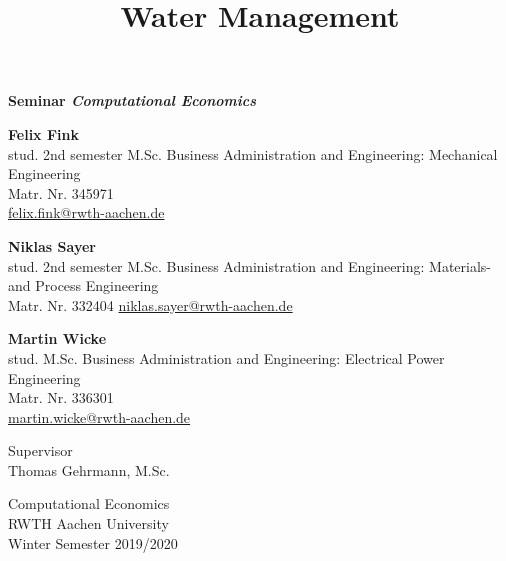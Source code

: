 \documentclass[12pt, a4paper, oneside]{article}
\title{Water Management}
\begin{document}
	
	
	\begin{titlepage}
		\begin{center}
			\vspace*{1cm}
			
			\textbf{Seminar \textit{Computational Economics}}                
			
			\vspace{0.5cm}
			{\makeatletter{\@title}\makeatother}
			
			\vspace{1.5cm}
			
			\textbf{Felix Fink} \\
			stud. 2nd semester M.Sc. Business Administration and Engineering: Mechanical Engineering \\
			Matr. Nr. 345971 \\
			\href{mailto:felix.fink@rwth-aachen.de}{felix.fink@rwth-aachen.de} 
			
			\vspace{1cm}
			
			\textbf{Niklas Sayer} \\
			stud. 2nd semester M.Sc. Business Administration and Engineering: Materials- and Process Engineering\\
			Matr. Nr. 332404
			\href{mailto:niklas.sayer@rwth-aachen.de}{niklas.sayer@rwth-aachen.de} 
			
			\vspace{1cm}
			
			\textbf{Martin Wicke} \\
			stud. M.Sc. Business Administration and Engineering: Electrical Power Engineering\\
			Matr. Nr. 336301 \\
			\href{mailto:martin.wicke@rwth-aachen.de}{martin.wicke@rwth-aachen.de} 
			
			\vfill
			
			
			Supervisor\\
			Thomas Gehrmann, M.Sc.
			
			\vspace{0.8cm}
			
			
			Computational Economics\\
			RWTH Aachen University\\
			Winter Semester 2019/2020
			
		\end{center}
	\end{titlepage}
\end{document}

